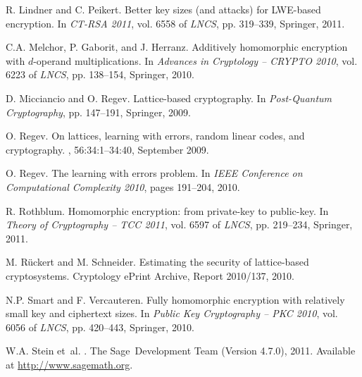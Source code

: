 \documentclass[draft]{llncs}
\begin{document}
\begin{thebibliography}{10}
R. Lindner and C. Peikert.
\newblock Better key sizes (and attacks) for {LWE}-based encryption.
\newblock In {\em CT-RSA 2011}, 
vol. 6558 of {\em LNCS}, pp. 319--339, Springer, 2011.

C.A. Melchor, P. Gaborit, and J. Herranz.
\newblock Additively homomorphic encryption with $d$-operand multiplications.
\newblock In {\em Advances in Cryptology -- {CRYPTO} 2010}, 
vol. 6223 of {\em LNCS}, pp. 138--154, Springer, 2010. 

D. Micciancio and O. Regev.
\newblock Lattice-based cryptography.
\newblock In {\em Post-Quantum Cryptography}, pp. 147--191, Springer, 2009.

O. Regev.
\newblock On lattices, learning with errors, random linear codes, and cryptography.
, 56:34:1--34:40, September 2009.

O. Regev.
\newblock The learning with errors problem.
\newblock In {\em IEEE Conference on Computational Complexity 2010}, pages 191--204, 2010.

R. Rothblum.
\newblock Homomorphic encryption: from private-key to public-key.
\newblock In {\em Theory of Cryptography -- TCC 2011}, 
vol. 6597 of {\em LNCS}, pp. 219--234, Springer, 2011. 

M. Rückert and M. Schneider.
\newblock Estimating the security of lattice-based cryptosystems.
\newblock Cryptology ePrint Archive, Report 2010/137, 2010.

N.P. Smart and F. Vercauteren.
\newblock Fully homomorphic encryption with relatively small key and ciphertext sizes.
\newblock In {\em Public Key Cryptography -- PKC 2010}, 
vol. 6056 of {\em LNCS}, pp. 420--443, Springer, 2010. 

W.A. Stein et~al.
.
\newblock The Sage~Development Team (Version 4.7.0), 2011.
\newblock Available at \url{http://www.sagemath.org}.
\end{thebibliography}
\end{document}
